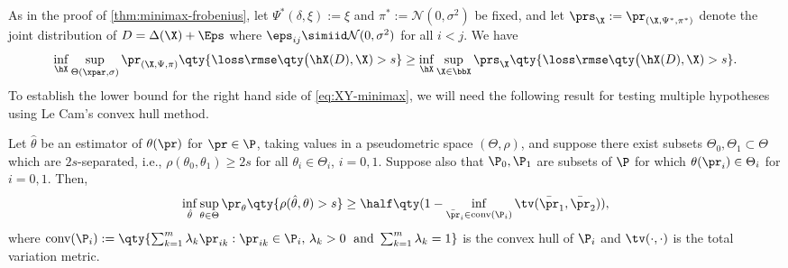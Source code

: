 \documentclass[10pt]{article}
\begin{document}
As in the proof of \cref{thm:minimax-frobenius}, let $\Psi^*(\delta, \xi) := \xi$ and $\pi^* := \mathcal{N}(0, \sigma^2)$ be fixed, and let $\prs_\X := \pr_{(\X, \Psi^*, \pi^*)}$ denote the joint distribution of $D = \Delta(\X) + \Eps$ where $\eps_{ij} \simiid \mathcal{N}(0, \sigma^2)$ for all $i < j$. We have
\begin{align}
    \inf_{\hX}\sup_{\Theta(\xpar, \sigma)} \pr_{(\X, \Psi, \pi)}\qty{ \loss\rmse\qty\big(\hX(D), \X) > s} 
    \ge 
    \inf_{\hX}\sup_{\X \in \bbX} \prs_{\X}\qty{ \loss\rmse\qty\big(\hX(D), \X) > s}.\label{eq:XY-minimax}
\end{align}
To establish the lower bound for the right hand side of \cref{eq:XY-minimax}, we will need the following result for testing multiple hypotheses using Le Cam's convex hull method.
\begin{lemma}\label{lem:le-cam}
    Let $\hat\theta$ be an estimator of $\theta(\pr)$ for $\pr \in \P$, taking values in a pseudometric space $(\Theta, \rho)$, and suppose there exist subsets $\Theta_0, \Theta_1 \subset \Theta$ which are $2s$-separated, i.e., $\rho(\theta_0, \theta_1) \ge 2s$ for all $\theta_i \in \Theta_i$, $i=0, 1$. Suppose also that $\P_0, \P_1$ are subsets of $\P$ for which $\theta(\pr_i) \in \Theta_i$ for $i=0,1$. Then,
    $$
    \inf_{\hat\theta}\sup_{\theta\in\Theta} \pr_{\theta}\qty{ \rho(\hat\theta, \theta) > s } \ge \half\qty( 1 - \inf_{{\bar\pr_i \in \textup{conv}(\P_i)}}\tv(\bar\pr_1, \bar\pr_2) ),
    $$
    where $\textup{conv}(\P_i) := \qty{ \sum_{k=1}^m{\lambda_k\pr_{ik}} : \pr_{ik} \in \P_i,\, \lambda_k > 0 \; \text{ and } \sum_{k=1}^m\lambda_k=1}$ is the convex hull of $\P_i$ and $\tv(\cdot, \cdot)$ is the total variation metric.
\end{lemma}
\end{document}
